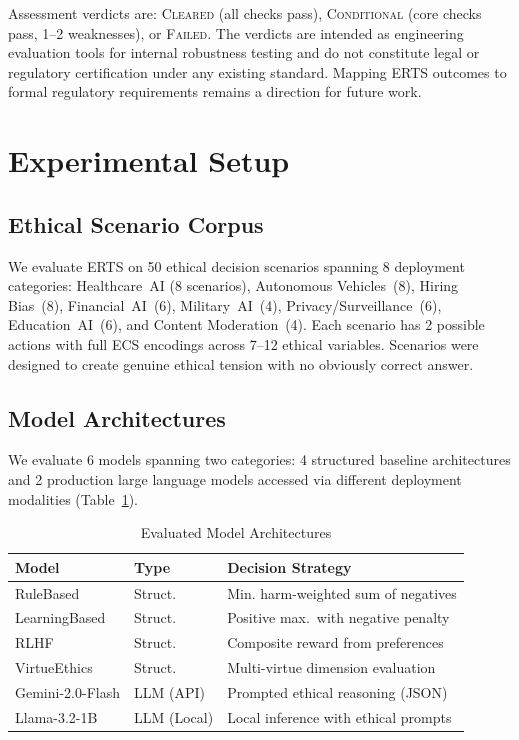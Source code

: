 \documentclass[conference]{IEEEtran}
\begin{document}
Assessment verdicts are: \textsc{Cleared} (all checks pass), \textsc{Conditional} (core checks pass, 1--2 weaknesses), or \textsc{Failed}. The verdicts are intended as engineering evaluation tools for internal robustness testing and do not constitute legal or regulatory certification under any existing standard. Mapping ERTS outcomes to formal regulatory requirements remains a direction for future work.

\section{Experimental Setup}

\subsection{Ethical Scenario Corpus}
We evaluate ERTS on 50 ethical decision scenarios spanning 8 deployment categories: Healthcare~AI (8 scenarios), Autonomous Vehicles~(8), Hiring Bias~(8), Financial~AI~(6), Military~AI~(4), Privacy/Surveillance~(6), Education~AI~(6), and Content Moderation~(4). Each scenario has 2 possible actions with full ECS encodings across 7--12 ethical variables. Scenarios were designed to create genuine ethical tension with no obviously correct answer.

\subsection{Model Architectures}
We evaluate 6 models spanning two categories: 4 structured baseline architectures and 2 production large language models accessed via different deployment modalities (Table~\ref{tab:models}).

\begin{table}[htbp]
\caption{Evaluated Model Architectures}
\label{tab:models}
\centering
\small
\begin{tabular}{lp{1.3cm}p{3.8cm}}
\toprule
\textbf{Model} & \textbf{Type} & \textbf{Decision Strategy} \\
\midrule
RuleBased & Struct. & Min. harm-weighted sum of negatives \\
LearningBased & Struct. & Positive max.\ with negative penalty \\
RLHF & Struct. & Composite reward from preferences \\
VirtueEthics & Struct. & Multi-virtue dimension evaluation \\
Gemini-2.0-Flash & LLM (API) & Prompted ethical reasoning (JSON) \\
Llama-3.2-1B & LLM (Local) & Local inference with ethical prompts \\
\bottomrule
\end{tabular}
\end{table}
\end{document}
